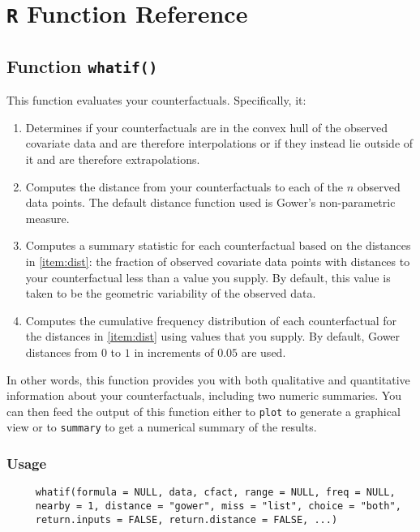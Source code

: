 \documentclass[oneside,letterpaper,titlepage]{article}
\begin{document}
\section{\texttt{R} Function Reference}

\subsection{Function \texttt{whatif()}}

This function evaluates your counterfactuals.  Specifically, it:
\begin{enumerate}
\item Determines if your counterfactuals are in the convex hull of the
  observed covariate data and are therefore interpolations or if they instead
  lie outside of it and are therefore extrapolations.
\item Computes the distance from your counterfactuals to
  each of the $n$ observed data points.  The default distance function used is
  Gower's non-parametric measure.  \label{item:dist}
\item Computes a summary statistic for each counterfactual based on
  the distances in \ref{item:dist}: the fraction of observed covariate data points with
  distances to your counterfactual less than a value you supply.
  By default, this value is taken to be the geometric variability of the
  observed data.
\item Computes the cumulative frequency distribution of each
  counterfactual for the distances in \ref{item:dist} using values that you
  supply.  By default, Gower distances from $0$ to $1$ in increments of
  $0.05$ are used.
\end{enumerate}
In other words, this function provides you with both qualitative and
quantitative information about your counterfactuals, including two
numeric summaries.  You can then feed the output of this function
either to \texttt{plot} to generate a graphical view or to
\texttt{summary} to get a numerical summary of the results.

\subsubsection{Usage}

\begin{verbatim}
     whatif(formula = NULL, data, cfact, range = NULL, freq = NULL, 
     nearby = 1, distance = "gower", miss = "list", choice = "both",
     return.inputs = FALSE, return.distance = FALSE, ...)
\end{verbatim}
\end{document}
